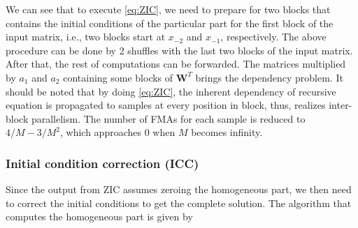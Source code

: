 
We can see that to execute \eqref{eq:ZIC}, we need to prepare for two blocks that contains the initial conditions of the particular part for the first block 
of the input matrix, i.e., two blocks start at $x_{-2}$ and $x_{-1}$, respectively. The above procedure can be done by 2 shuffles with the last two blocks of 
the input matrix.
After that, the rest of computations can be forwarded. The matrices
multiplied by $a_1$ and $a_2$ containing some blocks of $\bm{W}^T$
brings the dependency problem.
It should be noted that by doing \eqref{eq:ZIC},
the inherent dependency of recursive equation is propagated to samples at every position in block, thus, realizes inter-block parallelism. 
The number of FMAs for each sample is reduced to $4/M{-}3/M^2$,
which approaches 0 when $M$ becomes infinity.

\subsubsection{Initial condition correction (ICC)}

Since the output from ZIC assumes zeroing the homogeneous part, we then need to correct the initial conditions to get the complete solution.
The algorithm that computes the homogeneous part is given by

